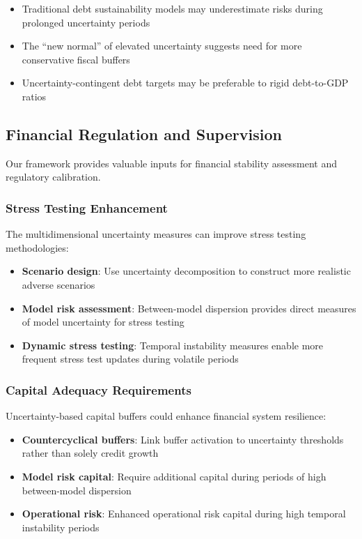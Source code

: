 \documentclass[5p,authoryear]{elsarticle}
\begin{document}
\begin{itemize}
    \item Traditional debt sustainability models may underestimate risks during prolonged uncertainty periods
    \item The ``new normal'' of elevated uncertainty suggests need for more conservative fiscal buffers
    \item Uncertainty-contingent debt targets may be preferable to rigid debt-to-GDP ratios
\end{itemize}

\subsection{Financial Regulation and Supervision}

Our framework provides valuable inputs for financial stability assessment and regulatory calibration.

\subsubsection{Stress Testing Enhancement}
The multidimensional uncertainty measures can improve stress testing methodologies:

\begin{itemize}
    \item \textbf{Scenario design}: Use uncertainty decomposition to construct more realistic adverse scenarios
    \item \textbf{Model risk assessment}: Between-model dispersion provides direct measures of model uncertainty for stress testing
    \item \textbf{Dynamic stress testing}: Temporal instability measures enable more frequent stress test updates during volatile periods
\end{itemize}

\subsubsection{Capital Adequacy Requirements}
Uncertainty-based capital buffers could enhance financial system resilience:

\begin{itemize}
    \item \textbf{Countercyclical buffers}: Link buffer activation to uncertainty thresholds rather than solely credit growth
    \item \textbf{Model risk capital}: Require additional capital during periods of high between-model dispersion
    \item \textbf{Operational risk}: Enhanced operational risk capital during high temporal instability periods
\end{itemize}
\end{document}

